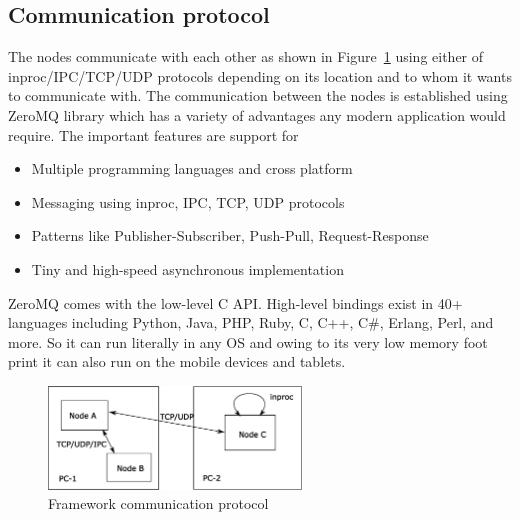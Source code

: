 \subsection{Communication protocol}	
The nodes communicate with each other as shown in Figure~\ref{fig:framework} using either of inproc/IPC/TCP/UDP protocols depending on its location and to whom it wants to communicate with. The communication between the nodes is established using ZeroMQ \cite{ZeroMQ} library which has a variety of advantages any modern application would require. The important features are support for
\begin{itemize}
\item Multiple programming languages and cross platform
\item Messaging using inproc, IPC, TCP, UDP protocols
\item Patterns like Publisher-Subscriber, Push-Pull, Request-Response
\item Tiny and high-speed asynchronous implementation
\end{itemize}
ZeroMQ comes with the low-level C API. High-level bindings exist in 40+ languages including Python, Java, PHP, Ruby, C, C++, C\#, Erlang, Perl, and more. So it can run literally in any OS and owing to its very low memory foot print it can also run on the mobile devices and tablets.
\begin{figure}[H]
\centering
\includegraphics[width=0.6\textwidth]{assets/architecture_comm.eps}
\caption[Framework communication protocol]{Framework communication protocol}
\label{fig:framework}
\end{figure}
